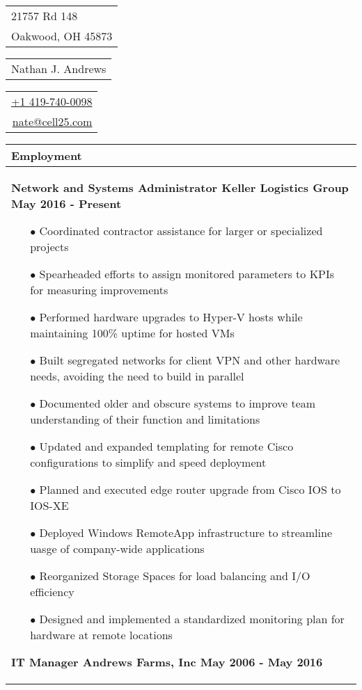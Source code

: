 \documentclass{article}
\begin{document}
\sffamily%
{\small\begin{tabular}[c]{l}
  21757 Rd 148 \\
  Oakwood, OH 45873
\end{tabular}}\hfill%
{\Large\bfseries\begin{tabular}[c]{c}
  Nathan J. Andrews
\end{tabular}}\hfill%
{\small\begin{tabular}[c]{r}
  \href{tel:14197400098}{+1 419-740-0098} \\
  \href{mailto:nate@cell25.com}{nate@cell25.com}
\end{tabular}}%

\bigskip

\begin{tabular}{p{\dimexpr\linewidth-2\tabcolsep}}
  \textbf{Employment} \\
  \hline
  {\bfseries Network and Systems Administrator \hfill Keller Logistics Group \qquad \qquad \qquad May 2016 - Present}
	\begin{itemize}
  	\item[$\bullet$]Coordinated contractor assistance for larger or specialized projects
  	\item[$\bullet$]Spearheaded efforts to assign monitored parameters to KPIs for measuring improvements
  	\item[$\bullet$]Performed hardware upgrades to Hyper-V hosts while maintaining 100\% uptime for hosted VMs
  	\item[$\bullet$]Built segregated networks for client VPN and other hardware needs, avoiding the need to build in parallel
  	\item[$\bullet$]Documented older and obscure systems to improve team understanding of their function and limitations
  	\item[$\bullet$]Updated and expanded templating for remote Cisco configurations to simplify and speed deployment
  	\item[$\bullet$]Planned and executed edge router upgrade from Cisco IOS to IOS-XE
  	\item[$\bullet$]Deployed Windows RemoteApp infrastructure to streamline uasge of company-wide applications
  	\item[$\bullet$]Reorganized Storage Spaces for load balancing and I/O efficiency
  	\item[$\bullet$]Designed and implemented a standardized monitoring plan for hardware at remote locations
  \end{itemize}
  {\bfseries IT Manager \hfill Andrews Farms, Inc \qquad \qquad \qquad May 2006 - May 2016} 

\end{tabular}
\end{document}
